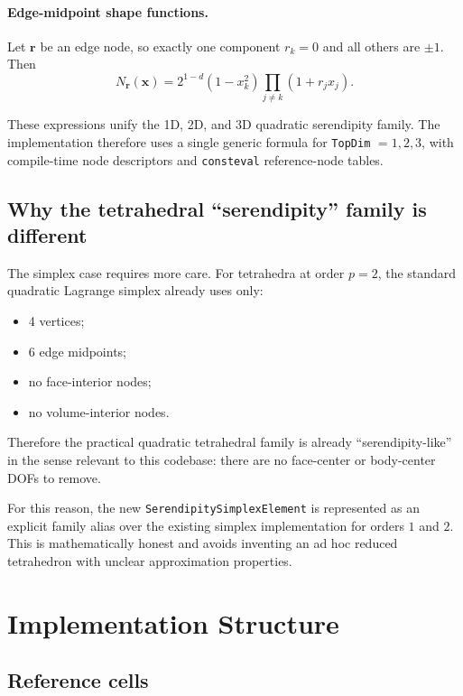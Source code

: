 \paragraph{Edge-midpoint shape functions.}
Let \(\mathbf{r}\) be an edge node, so exactly one component \(r_k = 0\) and all
others are \(\pm 1\).  Then
\[
N_{\mathbf{r}}(\mathbf{x})
=
2^{1-d}(1-x_k^2)\prod_{j \ne k}(1+r_j x_j).
\]

These expressions unify the 1D, 2D, and 3D quadratic serendipity family.
The implementation therefore uses a single generic formula for
\texttt{TopDim} \(=1,2,3\), with compile-time node descriptors and
\texttt{consteval} reference-node tables.

\subsection{Why the tetrahedral ``serendipity'' family is different}

The simplex case requires more care.  For tetrahedra at order \(p=2\), the
standard quadratic Lagrange simplex already uses only:

\begin{itemize}[nosep]
  \item 4 vertices;
  \item 6 edge midpoints;
  \item no face-interior nodes;
  \item no volume-interior nodes.
\end{itemize}

Therefore the practical quadratic tetrahedral family is already
``serendipity-like'' in the sense relevant to this codebase: there are no
face-center or body-center DOFs to remove.

For this reason, the new \texttt{SerendipitySimplexElement} is represented as an
explicit family alias over the existing simplex implementation for
orders \(1\) and \(2\).  This is mathematically honest and avoids inventing an
ad hoc reduced tetrahedron with unclear approximation properties.


\section{Implementation Structure}
\label{sec:serendipity_impl}

\subsection{Reference cells}

